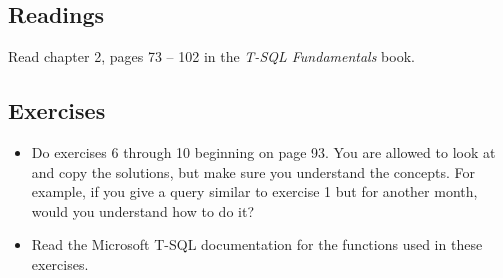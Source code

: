 \documentclass{article}
\begin{document}
        \subsection{Readings}
        Read chapter 2, pages 73 -- 102 in the \textit{T-SQL Fundamentals} book.

        
        \subsection{Exercises}

        \begin{itemize}
        \item Do exercises 6 through 10 beginning on page 93. You are allowed to look at and copy the solutions, but make sure you understand the concepts. For example, if you give a query similar to exercise 1 but for another month, would you understand how to do it?

        \item Read the Microsoft T-SQL documentation for the functions used in these exercises.
        \end{itemize}
\end{document}
